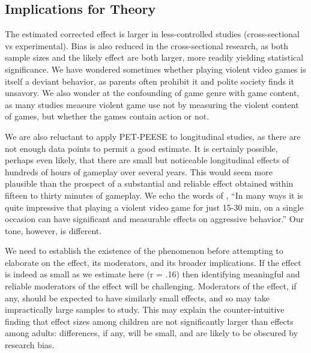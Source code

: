 \documentclass[man]{apa6}
\begin{document}
\subsection{Implications for Theory}
The estimated corrected effect is larger in less-controlled studies (cross-sectional vs experimental). Bias is also reduced in the cross-sectional research, as both sample sizes and the likely effect are both larger, more readily yielding statistical significance. 
We have wondered sometimes whether playing violent video games is itself a deviant behavior, as parents often prohibit it and polite society finds it unsavory. We also wonder at the confounding of game genre with game content, as many studies %
measure violent game use not by measuring the violent content of games, but whether the games contain action or not.

We are also reluctant to apply PET-PEESE to longitudinal studies, as there are not enough data points to permit a good estimate. It is certainly possible, perhaps even likely, that there are small but noticeable longitudinal effects of hundreds of hours of gameplay over several years. This would seem more plausible than the prospect of a substantial and reliable effect obtained within fifteen to thirty minutes of gameplay. We echo the words of \citet[p. 51]{Bushman:Huesmann:2014}, ``In many ways it is quite impressive that playing a violent video game for just 15-30 min, on a single occasion can have significant and measurable effects on aggressive behavior.'' Our tone, however, is different.

We need to establish the existence of the phenomenon before attempting to elaborate on the effect, its moderators, and its broader implications. If the effect is indeed as small as we estimate here (r = .16) then identifying meaningful and reliable moderators of the effect will be challenging.  Moderators of the effect, if any, should be expected to have similarly small effects, and so may take impractically large samples to study. This may explain the counter-intuitive finding that effect sizes among children are not significantly larger than effects among adults: differences, if any, will be small, and are likely to be obscured by research bias. 
\end{document}
